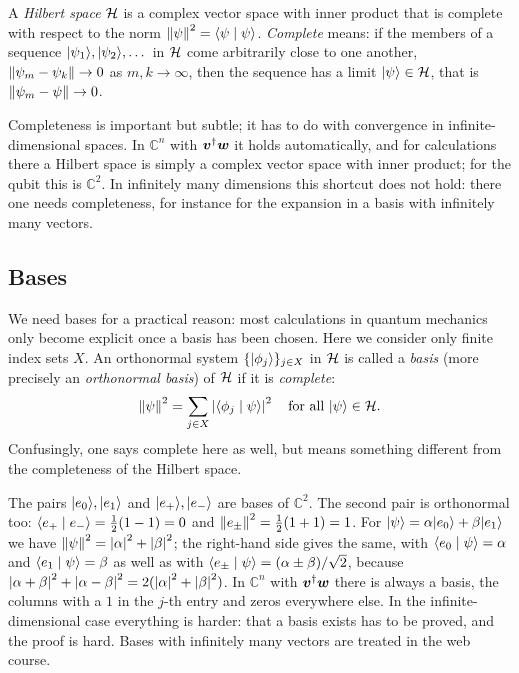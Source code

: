 \begin{definition}
	A \emph{Hilbert space} $\mathcal{H}$ is a complex vector space with inner product that is complete with respect to the norm $\left\lVert \psi \right\rVert^2 = \langle \psi \mid \psi \rangle$. \emph{Complete} means: if the members of a sequence $\lvert \psi_1 \rangle,\lvert \psi_2 \rangle,\dots$ in $\mathcal{H}$ come arbitrarily close to one another, $\left\lVert \psi_m - \psi_k \right\rVert \to 0$ as $m,k \to \infty$, then the sequence has a limit $\lvert \psi \rangle\in\mathcal{H}$, that is $\left\lVert \psi_m - \psi \right\rVert \to 0$.
\end{definition}

Completeness is important but subtle; it has to do with convergence in infinite-dimensional spaces. In $\mathbb{C}^n$ with $\boldsymbol{v}^{\dagger}\boldsymbol{w}$ it holds automatically, and for calculations there a Hilbert space is simply a complex vector space with inner product; for the qubit this is $\mathbb{C}^2$. In infinitely many dimensions this shortcut does not hold: there one needs completeness, for instance for the expansion in a basis with infinitely many vectors.

\subsection{Bases}
We need bases for a practical reason: most calculations in quantum mechanics only become explicit once a basis has been chosen. Here we consider only finite index sets $X$. An orthonormal system $\{\lvert \phi_j \rangle\}_{j\in X}$ in $\mathcal{H}$ is called a \emph{basis} (more precisely an \emph{orthonormal basis}) of $\mathcal{H}$ if it is \emph{complete}:
\begin{equation}
	\left\lVert \psi \right\rVert^2 = \sum_{j\in X}\left\lvert \langle \phi_j \mid \psi \rangle \right\rvert^2 \quad \text{for all } \lvert \psi \rangle\in\mathcal{H}.
\end{equation}
Confusingly, one says complete here as well, but means something different from the completeness of the Hilbert space.

The pairs $\lvert e_0 \rangle,\lvert e_1 \rangle$ and $\lvert e_+ \rangle,\lvert e_- \rangle$ are bases of $\mathbb{C}^2$. The second pair is orthonormal too: $\langle e_+ \mid e_- \rangle = \tfrac12(1 - 1) = 0$ and $\left\lVert e_\pm \right\rVert^2 = \tfrac12(1 + 1) = 1$. For $\lvert \psi \rangle = \alpha\lvert e_0 \rangle + \beta\lvert e_1 \rangle$ we have $\left\lVert \psi \right\rVert^2 = \left\lvert \alpha \right\rvert^2 + \left\lvert \beta \right\rvert^2$; the right-hand side gives the same, with $\langle e_0 \mid \psi \rangle = \alpha$ and $\langle e_1 \mid \psi \rangle = \beta$ as well as with $\langle e_\pm \mid \psi \rangle = (\alpha \pm \beta)/\sqrt{2}$, because $\left\lvert \alpha + \beta \right\rvert^2 + \left\lvert \alpha - \beta \right\rvert^2 = 2(\left\lvert \alpha \right\rvert^2 + \left\lvert \beta \right\rvert^2)$. In $\mathbb{C}^n$ with $\boldsymbol{v}^{\dagger}\boldsymbol{w}$ there is always a basis, the columns with a $1$ in the $j$-th entry and zeros everywhere else. In the infinite-dimensional case everything is harder: that a basis exists has to be proved, and the proof is hard. Bases with infinitely many vectors are treated in the web course.


